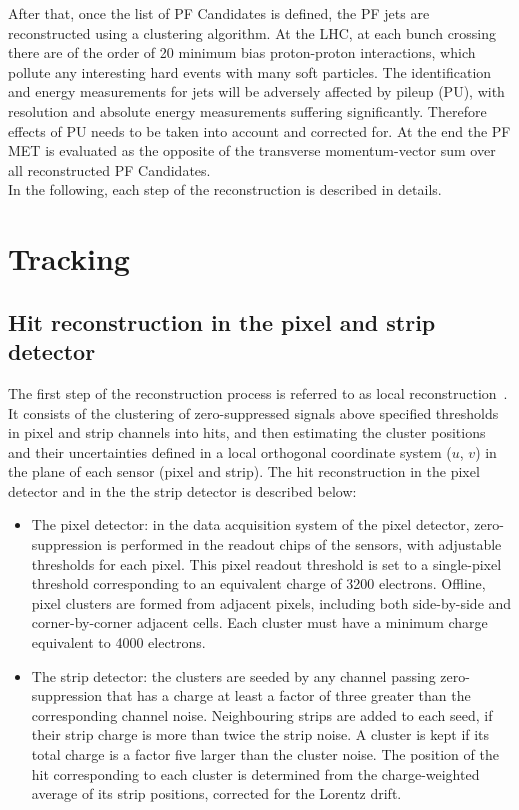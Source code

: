 After that, once the list of PF Candidates is defined, the PF jets are reconstructed using a clustering algorithm. At the LHC,  at each bunch crossing there are of the order of 20 minimum bias proton-proton interactions, which pollute any interesting hard events with many soft particles. 
The identification and energy measurements for jets will be adversely affected by pileup (PU), with resolution and absolute energy measurements suffering significantly. 
Therefore effects of PU needs to be taken into account and corrected for. At the end the PF MET is evaluated as the opposite of the transverse momentum-vector sum over all reconstructed PF Candidates.\\
In the following, each step of the reconstruction is described in details. 

\section{Tracking}
\subsection*{Hit reconstruction in the pixel and strip detector}
The first step of the reconstruction process is referred to as local reconstruction~\cite{Chatrchyan:2014fea}.  It consists of the clustering of zero-suppressed
signals above specified thresholds in pixel and strip channels into hits,  and then estimating the cluster positions and their uncertainties defined in a local
orthogonal  coordinate  system ($u$, $v$) in  the  plane  of  each  sensor (pixel and strip). 
The  hit reconstruction in the pixel detector and in the the strip detector is described below:
\begin{itemize} 
\item The pixel detector: in the data acquisition system of the pixel detector, zero-suppression is performed in the
readout chips of the sensors, with adjustable thresholds for each pixel.  This pixel readout threshold 
is set to a single-pixel threshold corresponding to an equivalent charge of 3200
electrons.  Offline, pixel clusters are formed from adjacent pixels, including both side-by-side
and corner-by-corner adjacent cells.  Each cluster must have a minimum charge equivalent to
4000 electrons.
\item The strip detector:  the clusters are seeded by any channel passing zero-suppression that has a charge at least a
factor of three greater than the corresponding channel noise. Neighbouring strips are added
to each seed, if their strip charge is more than twice the strip noise. 
A cluster is kept if its total charge is a factor five larger than the cluster noise.
The position of the hit corresponding to each cluster is determined from the charge-weighted
average of its strip positions, corrected for the  Lorentz drift.
\end{itemize}

